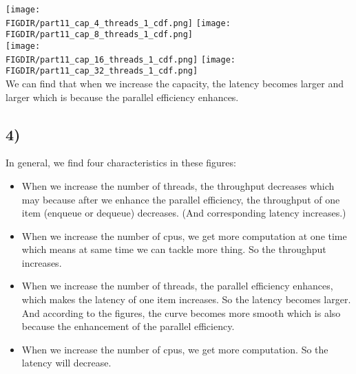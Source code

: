 \documentclass{article}
\newcommand{\FIGDIR}{} %
\begin{document}
\begin{spacing}{1.1}
\texttt{[image: \\FIGDIR/part11\_cap\_4\_threads\_1\_cdf.png]}
\texttt{[image: \\FIGDIR/part11\_cap\_8\_threads\_1\_cdf.png]}
\\\texttt{[image: \\FIGDIR/part11\_cap\_16\_threads\_1\_cdf.png]}
\texttt{[image: \\FIGDIR/part11\_cap\_32\_threads\_1\_cdf.png]}
\\\indent We can find that when we increase the capacity, the latency becomes larger and larger which is because the parallel efficiency enhances.

\subsection*{4)}
\indent In general, we find four characteristics in these figures:
\begin{itemize}
    \item When we increase the number of threads, the throughput decreases which may because after we enhance the parallel efficiency, the throughput of one item (enqueue or dequeue) decreases. (And corresponding latency increases.)
    \item When we increase the number of cpus, we get more computation at one time which means at same time we can tackle more thing. So the throughput increases.
    \item When we increase the number of threads, the parallel efficiency enhances, which makes the latency of one item increases. So the latency becomes larger. And according to the figures, the curve becomes more smooth which is also because the enhancement of the parallel efficiency.
    \item When we increase the number of cpus, we get more computation. So the latency will decrease.
\end{itemize}


\end{spacing}
\end{document}
